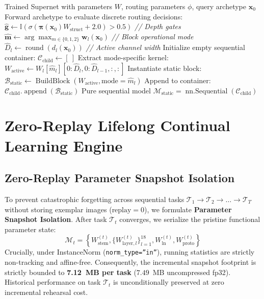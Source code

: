 \documentclass[11pt, a4paper]{article}
\begin{document}
\begin{algorithm}[t]
\caption{Static Subnet Compilation and Hard Pruning}
\label{alg:export}
\begin{algorithmic}[1]
\REQUIRE Trained Supernet with parameters $W$, routing parameters $\phi$, query archetype $\mathbf{x}_0$
\STATE Forward archetype to evaluate discrete routing decisions:
\STATE $\hat{\mathbf{g}} \gets \mathbb{I}(\sigma(\boldsymbol{\pi}(\mathbf{x}_0) W_{\text{struct}} + 2.0) > 0.5)$ \hfill \textit{// Depth gates}
\STATE $\hat{\mathbf{m}} \gets \arg\max_{m \in \{0, 1, 2\}} \mathbf{w}_l(\mathbf{x}_0)$ \hfill \textit{// Block operational mode}
\STATE $\hat{D}_l \gets \operatorname{round}(d_l(\mathbf{x}_0))$ \hfill \textit{// Active channel width}
\STATE Initialize empty sequential container: $\mathcal{C}_{\text{child}} \gets [\ ]$
        \STATE Extract mode-specific kernel: $W_{\text{active}} \gets W_l[\hat{m}_l][0:\hat{D}_l, 0:\hat{D}_{l-1}, :, :]$
        \STATE Instantiate static block: $\mathcal{B}_{\text{static}} \gets \operatorname{BuildBlock}(W_{\text{active}}, \text{mode}=\hat{m}_l)$
        \STATE Append to container: $\mathcal{C}_{\text{child}}.\operatorname{append}(\mathcal{B}_{\text{static}})$
    \ENDIF
\ENDFOR
\RETURN Pure sequential model $\mathcal{M}_{\text{static}} = \operatorname{nn.Sequential}(\mathcal{C}_{\text{child}})$
\end{algorithmic}
\end{algorithm}

\section{Zero-Replay Lifelong Continual Learning Engine}
\label{sec:continual}

\subsection{Zero-Replay Parameter Snapshot Isolation}

To prevent catastrophic forgetting across sequential tasks $\mathcal{T}_1 \to \mathcal{T}_2 \to \dots \to \mathcal{T}_T$ without storing exemplar images ($\text{replay}=0$), we formulate \textbf{Parameter Snapshot Isolation}. After task $\mathcal{T}_t$ converges, we serialize the pristine functional parameter state:
\begin{equation}
    \mathcal{M}_t = \left\{ W_{\text{stem}}^{(t)}, \{W_{\text{layer}, l}^{(t)}\}_{l=1}^{18}, W_{\text{ln}}^{(t)}, W_{\text{proto}}^{(t)} \right\}
\end{equation}
Crucially, under InstanceNorm (\texttt{norm\_type=''in''}), running statistics are strictly non-tracking and affine-free. Consequently, the incremental snapshot footprint is strictly bounded to \textbf{7.12~MB per task} ($7.49$~MB uncompressed fp32). Historical performance on task $\mathcal{T}_t$ is unconditionally preserved at zero incremental rehearsal cost.
\end{document}
